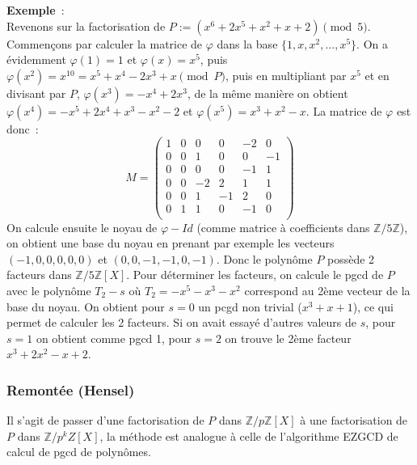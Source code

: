 \documentclass[a4paper,11pt]{article}
\begin{document}
\begin{giacjshere}
{\bf Exemple}~:\\
Revenons sur la factorisation de $P:=(x^6+2x^5+x^2+x+2) \pmod 5$.
Commençons par calculer la matrice de $\varphi$ dans la base
$\{ 1,x,x^2,...,x^5\}$. On a évidemment $\varphi(1)=1$ et
$\varphi(x)=x^5$, puis $\varphi(x^2)=x^{10}=x^5+x^4-2x^3+x \pmod P$,
puis en multipliant par $x^5$ et en divisant par $P$,
$\varphi(x^3)=-x^4+2x^3$, de la même manière on obtient 
$\varphi(x^4)=-x^5+2x^4+x^3-x^2-2$ et $\varphi(x^5)=x^3+x^2-x$.
La matrice de $\varphi$ est donc~:
\[ M=\left( 
\begin{array}{cccccc}
1& 0& 0 &0 &-2&0\\
0& 0& 1 &0 &0 &-1\\
0& 0& 0 &0 &-1&1\\
0& 0& -2&2 & 1&1\\
0& 0& 1 &-1& 2&0\\
0& 1& 1 &0 &-1&0\\
\end{array}
\right)\]
On calcule ensuite le noyau de $\varphi-Id$ (comme matrice à coefficients
dans $\mathbb{Z}/5\mathbb{Z}$), on obtient une
base du noyau en prenant par exemple les vecteurs $(-1,0,0,0,0,0)$
et $(0,0,-1,-1,0,-1)$. Donc le polynôme $P$ possède 2 facteurs dans
$\mathbb{Z}/5\mathbb{Z}[X]$. Pour déterminer les facteurs, on calcule le pgcd de $P$
avec le polynôme $T_2-s$ où $T_2=-x^5-x^3-x^2$ correspond au 2ème
vecteur de la base du noyau. On obtient pour $s=0$ un pcgd non trivial
($x^3+x+1$), ce qui permet de calculer les 2 facteurs. Si on avait
essayé d'autres valeurs de $s$, pour $s=1$ on obtient comme pgcd 1, pour
$s=2$ on trouve le 2ème facteur $x^3+2x^2-x+2$.

\subsubsection{Remontée (Hensel)} 
Il s'agit de passer d'une factorisation de $P$ dans $\mathbb{Z}/p\mathbb{Z}[X]$ à une
factorisation de $P$ dans $\mathbb{Z}/p^k Z[X]$, la méthode est analogue à celle
de l'algorithme EZGCD de calcul de pgcd de polynômes.


\end{giacjshere}
\end{document}
